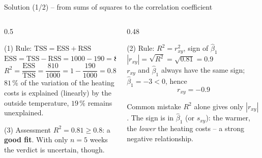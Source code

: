 \documentclass[aspectratio=169,11pt]{beamer}
\begin{document}
\begin{frame}{Solution (1/2) -- from sums of squares to the correlation coefficient}
  \begin{columns}[T]
    \begin{column}{0.5\textwidth}
      \small
      \begin{block}{(1) Rule: $\text{TSS} = \text{ESS} + \text{RSS}$}
        $\text{ESS} = \text{TSS} - \text{RSS} = 1000 - 190 = \mathbf{810}$\\[3pt]
        $R^{2} = \dfrac{\text{ESS}}{\text{TSS}} = \dfrac{810}{1000} = 1 - \dfrac{190}{1000} = \mathbf{0.81}$\\[3pt]
        $81\,\%$ of the variation of the heating costs is explained (linearly)
        by the outside temperature, $19\,\%$ remains unexplained.
      \end{block}
      \begin{exampleblock}{(3) Assessment}
        $R^{2} = 0.81 \ge 0.8$: a \textbf{good fit}. With only $n = 5$ weeks
        the verdict is uncertain, though.
      \end{exampleblock}
    \end{column}
    \begin{column}{0.48\textwidth}
      \small
      \begin{block}{(2) Rule: $R^{2} = r_{xy}^{2}$, sign of $\hat{\beta}_1$}
        $|r_{xy}| = \sqrt{R^{2}} = \sqrt{0.81} = 0.9$\\[3pt]
        $r_{xy}$ and $\hat{\beta}_1$ always have the same sign;
        $\hat{\beta}_1 = -3 < 0$, hence
        \[ r_{xy} = \mathbf{-0.9} \]
        \vspace{-10pt}
      \end{block}
      \begin{alertblock}{Common mistake}
        $R^{2}$ alone gives only $|r_{xy}|$. The sign is in $\hat{\beta}_1$
        (or $s_{xy}$): the warmer, the \emph{lower} the heating costs -- a
        strong negative relationship.
      \end{alertblock}
    \end{column}
  \end{columns}
\end{frame}
\end{document}
